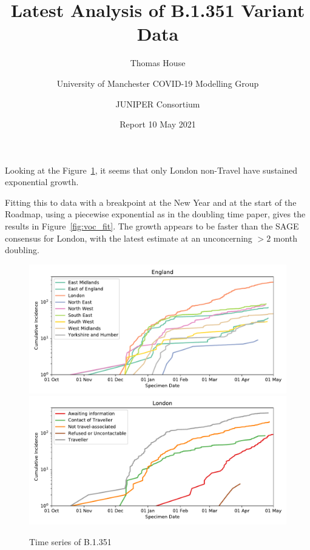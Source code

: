 \documentclass[10pt,a4paper]{article}
\title{\sc Latest Analysis of B.1.351 Variant Data}
\author{Thomas House \and University of Manchester
COVID-19 Modelling Group \and JUNIPER Consortium}
\date{Report 10 May 2021}
\begin{document}
\maketitle
\thispagestyle{fancy}

Looking at the Figure~\ref{fig:voc_log}, it seems that only London non-Travel
have sustained exponential growth.

Fitting this to data with a breakpoint at the New Year and at the start of the
Roadmap, using a piecewise exponential as in the doubling time paper, gives
the results in Figure~\ref{fig:voc_fit}. The growth appears to be faster than
the SAGE consensus for London, with the latest estimate at an unconcerning
$>2$ month doubling.

\clearpage

\begin{figure}
\centering
\includegraphics[width=1.0\textwidth]{../figures/voc_region_log.pdf}\\
\includegraphics[width=1.0\textwidth]{../figures/voc_london_log.pdf}\\
\caption{Time series of B.1.351}
\label{fig:voc_log}
\end{figure}

\clearpage
\end{document}
